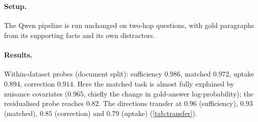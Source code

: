 \section{\twowiki{}}
\label{app:twowiki}
\paragraph{Setup.} The Qwen pipeline is run unchanged on \twowiki{} two-hop questions, with gold paragraphs from its supporting facts and its own distractors.

\paragraph{Results.} Within-dataset probes (document split): sufficiency $0.986$, matched $0.972$, uptake $0.894$, correction $0.914$. Here the matched task is almost fully explained by nuisance covariates ($0.965$, chiefly the change in gold-answer log-probability); the residualised probe reaches $0.82$. The \musique{} directions transfer at $0.96$ (sufficiency), $0.93$ (matched), $0.85$ (correction) and $0.79$ (uptake) (\cref{tab:transfer}).
